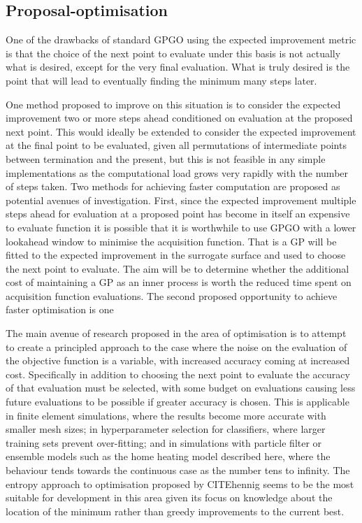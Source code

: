 \documentclass[a4paper, 10 pt, conference]{ieeeconf}  %
\begin{document}
\subsection{Proposal-optimisation}
One of the drawbacks of standard GPGO using the expected improvement metric is that the choice of the next point to evaluate under this basis is not actually what is desired, except for the very final evaluation. What is truly desired is the point that will lead to eventually finding the minimum many steps later.

One method proposed to improve on this situation is to consider the expected improvement two or more steps ahead conditioned on evaluation at the proposed next point. This would ideally be extended to consider the expected improvement at the final point to be evaluated, given all permutations of intermediate points between termination and the present, but this is not feasible in any simple implementations as the computational load grows very rapidly with the number of steps taken. Two methods for achieving faster computation are proposed as potential avenues of investigation. First, since the expected improvement multiple steps ahead for evaluation at a proposed point has become in itself an expensive to evaluate function it is possible that it is worthwhile to use GPGO with a lower lookahead window to minimise the acquisition function. That is a GP will be fitted to the expected improvement in the surrogate surface and used to choose the next point to evaluate. The aim will be to determine whether the additional cost of maintaining a GP as an inner process is worth the reduced time spent on acquisition function evaluations. The second proposed opportunity to achieve faster optimisation is one 

The main avenue of research proposed in the area of optimisation is to attempt to create a principled approach to the case where the noise on the evaluation of the objective function is a variable, with increased accuracy coming at increased cost. Specifically in addition to choosing the next point to evaluate the accuracy of that evaluation must be selected, with some budget on evaluations causing less future evaluations to be possible if greater accuracy is chosen. This is applicable in finite element simulations, where the results become more accurate with smaller mesh sizes; in hyperparameter selection for classifiers, where larger training sets prevent over-fitting; and in simulations with particle filter or ensemble models such as the home heating model described here, where the behaviour tends towards the continuous case as the number tens to infinity. The entropy approach to optimisation proposed by CITEhennig seems to be the most suitable for development in this area given its focus on knowledge about the location of the minimum rather than greedy improvements to the current best.
\end{document}
